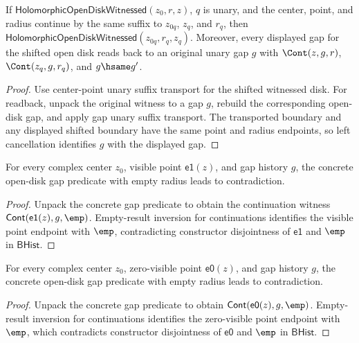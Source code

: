 \begin{theorem}
\label{thm:holomorphic-open-disk-witnessed-center-point-unary-suffix-gap-public-readback}
If $\mathsf{HolomorphicOpenDiskWitnessed}(z_0,r,z)$, $q$ is unary, and
the center, point, and radius continue by the same suffix to $z_{0q}$,
$z_q$, and $r_q$, then
$\mathsf{HolomorphicOpenDiskWitnessed}(z_{0q},r_q,z_q)$. Moreover, every
displayed gap for the shifted open disk reads back to an original unary gap
$g$ with $\Cont(z,g,r)$, $\Cont(z_q,g,r_q)$, and $g\hsame g'$.
\end{theorem}
\begin{proof}
Use center-point unary suffix transport for the shifted witnessed disk. For
readback, unpack the original witness to a gap $g$, rebuild the corresponding
open-disk gap, and apply gap unary suffix transport. The transported boundary
and any displayed shifted boundary have the same point and radius endpoints, so
left cancellation identifies $g$ with the displayed gap.
\end{proof}

\begin{theorem}
\label{thm:holo-open-disk-e1-point-empty-radius-absurd}
For every complex center \(z_0\), visible point \(\mathsf{e1}(z)\), and gap
history \(g\), the concrete open-disk gap predicate with empty radius leads to
contradiction.
\end{theorem}
\begin{proof}
Unpack the concrete gap predicate to obtain the continuation witness
\(\mathsf{Cont}(\mathsf{e1}(z),g,\emp)\). Empty-result inversion for
continuations identifies the visible point endpoint with \(\emp\), contradicting
constructor disjointness of \(\mathsf{e1}\) and \(\emp\) in \(\mathsf{BHist}\).
\end{proof}

\begin{theorem}
\label{thm:holo-open-disk-e0-point-empty-radius-absurd}
For every complex center \(z_0\), zero-visible point \(\mathsf{e0}(z)\), and
gap history \(g\), the concrete open-disk gap predicate with empty radius leads
to contradiction.
\end{theorem}
\begin{proof}
Unpack the concrete gap predicate to obtain
\(\mathsf{Cont}(\mathsf{e0}(z),g,\emp)\). Empty-result inversion for
continuations identifies the zero-visible point endpoint with \(\emp\), which
contradicts constructor disjointness of \(\mathsf{e0}\) and \(\emp\) in
\(\mathsf{BHist}\).
\end{proof}

